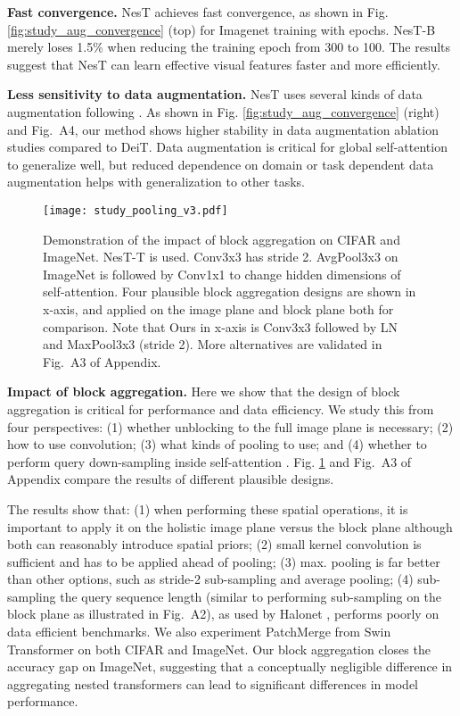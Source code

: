 \documentclass{article}
\newcommand{\topic}[1]{\noindent \textbf{#1}}
\newcommand{\OURS}{NesT\xspace}
\begin{document}
\topic{Fast convergence.}
\OURS achieves fast convergence, as shown in Fig. \ref{fig:study_aug_convergence} (top) for Imagenet training with  epochs. \OURS-B merely loses 1.5\% when reducing the training epoch from 300 to 100. The results suggest that \OURS can learn effective visual features faster and more efficiently.

\topic{Less sensitivity to data augmentation.} 
\OURS uses several kinds of data augmentation following \cite{touvron2020training}.
As shown in Fig. \ref{fig:study_aug_convergence} (right) and Fig.~A4, our method shows higher stability in data augmentation ablation studies compared to DeiT. 
Data augmentation is critical for global self-attention to generalize well, but reduced dependence on domain or task dependent data augmentation helps with generalization to other tasks.



\begin{figure}[t]
    \centering
    \texttt{[image: study\_pooling\_v3.pdf]} 
    \caption{Demonstration of the impact of block aggregation on CIFAR and ImageNet. \OURS-T is used. 
    Conv3x3 has stride 2. AvgPool3x3 on ImageNet is followed by Conv1x1 to change hidden dimensions of self-attention. 
    Four plausible block aggregation designs are shown in x-axis, and applied on the image plane and block plane both for comparison. Note that Ours in x-axis is Conv3x3 followed by LN and MaxPool3x3 (stride 2).
    More alternatives are validated in Fig.~A3 of Appendix.
    }
    \label{fig:node_pooling}
\vspace{-.2cm}
\end{figure}

\topic{Impact of block aggregation.} 
Here we show that the design of block aggregation is critical for performance and data efficiency.
We study this from four perspectives: 
(1) whether unblocking to the full image plane is necessary; 
(2) how to use convolution; 
(3) what kinds of pooling to use; and
(4) whether to perform query down-sampling inside self-attention \cite{vaswani2021scaling}. 
Fig. \ref{fig:node_pooling} and Fig.~A3 of Appendix compare the results of different plausible designs.

The results show that: 
(1) when performing these spatial operations, it is important to apply it on the holistic image plane versus the block plane although both can reasonably introduce spatial priors;
(2) small kernel convolution is sufficient and has to be applied ahead of pooling; 
(3) max. pooling is far better than other options, such as stride-2 sub-sampling and average pooling;
(4) sub-sampling the query sequence length (similar to performing sub-sampling on the block plane as illustrated in Fig.~A2), as used by Halonet \cite{vaswani2021scaling}, performs poorly on data efficient benchmarks. 
We also experiment PatchMerge from Swin Transformer \cite{liu2021swin} on both CIFAR and ImageNet. 
Our block aggregation closes the accuracy gap on ImageNet, suggesting that a conceptually negligible difference in aggregating nested transformers can lead to significant differences in model performance.
\end{document}
